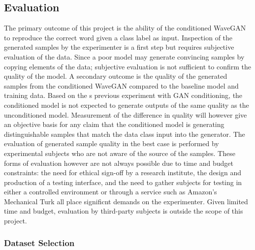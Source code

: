 \documentclass[a4paper, dvipsnames, titlepage]{article}
\begin{document}
\subsection{Evaluation}

The primary outcome of this project is the ability of the conditioned WaveGAN to reproduce the correct word given a class label as input.
Inspection of the generated samples by the experimenter is a first step but requires subjective evaluation of the data.
Since a poor model may generate convincing samples by copying elements of the data; subjective evaluation is not sufficient to confirm the quality of the model.
\newline
\newline
A secondary outcome is the quality of the generated samples from the conditioned WaveGAN compared to the baseline model and training data.
Based on the \citeauthor{2014arXiv1411.1784M}s previous experiment with GAN conditioning, the conditioned model is not expected to generate outputs of the same quality as the unconditioned model.
Measurement of the difference in quality will however give an objective basis for any claim that the conditioned model is generating distinguishable samples that match the data class input into the generator.
\newline
\newline
The evaluation of generated sample quality in the best case is performed by experimental subjects who are not aware of the source of the samples.
These forms of evaluation however are not always possible due to time and budget constraints: the need for ethical sign-off by a research institute, the design and production of a testing interface, and the need to gather subjects for testing in either a controlled environment or through a service such as Amazon's Mechanical Turk all place significnt demands on the experimenter.
Given limited time and budget, evaluation by third-party subjects is outside the scope of this project.

\subsubsection{Dataset Selection}
\end{document}

